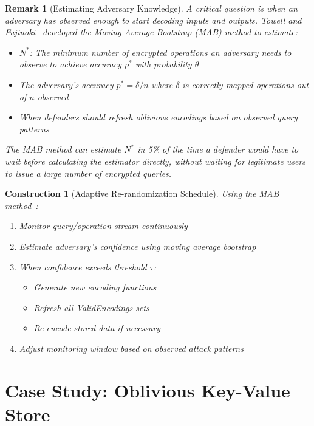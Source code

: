 \documentclass[11pt,final]{article}
\newtheorem{remark}[theorem]{Remark}
\newtheorem{construction}[theorem]{Construction}
\begin{document}
\begin{remark}[Estimating Adversary Knowledge]
A critical question is when an adversary has observed enough to start decoding inputs and outputs. Towell and Fujinoki~\cite{towell2016estimating} developed the Moving Average Bootstrap (MAB) method to estimate:
\begin{itemize}
    \item $N^*$: The minimum number of encrypted operations an adversary needs to observe to achieve accuracy $p^*$ with probability $\theta$
    \item The adversary's accuracy $p^* = \delta/n$ where $\delta$ is correctly mapped operations out of $n$ observed
    \item When defenders should refresh oblivious encodings based on observed query patterns
\end{itemize}
The MAB method can estimate $N^*$ in 5\% of the time a defender would have to wait before calculating the estimator directly, without waiting for legitimate users to issue a large number of encrypted queries.
\end{remark}

\begin{construction}[Adaptive Re-randomization Schedule]
Using the MAB method~\cite{towell2016estimating}:
\begin{enumerate}
    \item Monitor query/operation stream continuously
    \item Estimate adversary's confidence using moving average bootstrap
    \item When confidence exceeds threshold $\tau$:
        \begin{itemize}
            \item Generate new encoding functions
            \item Refresh all ValidEncodings sets
            \item Re-encode stored data if necessary
        \end{itemize}
    \item Adjust monitoring window based on observed attack patterns
\end{enumerate}
\end{construction}

\section{Case Study: Oblivious Key-Value Store}
\end{document}

